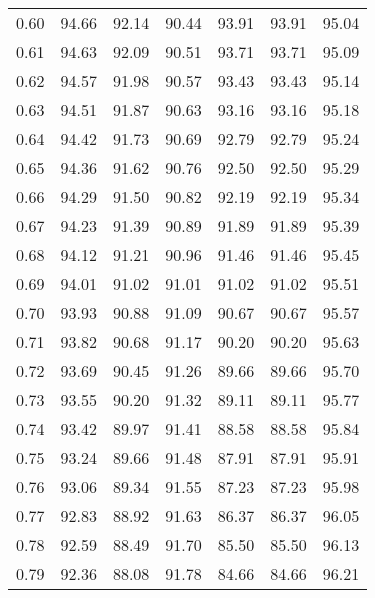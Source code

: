 \begin{tabular}{|c|c|c|c|c|c|c|}
      0.60 &     94.66 &     92.14 &      90.44 &   93.91 &      93.91 &         95.04 \\
      0.61 &     94.63 &     92.09 &      90.51 &   93.71 &      93.71 &         95.09 \\
      0.62 &     94.57 &     91.98 &      90.57 &   93.43 &      93.43 &         95.14 \\
      0.63 &     94.51 &     91.87 &      90.63 &   93.16 &      93.16 &         95.18 \\
      0.64 &     94.42 &     91.73 &      90.69 &   92.79 &      92.79 &         95.24 \\
      0.65 &     94.36 &     91.62 &      90.76 &   92.50 &      92.50 &         95.29 \\
      0.66 &     94.29 &     91.50 &      90.82 &   92.19 &      92.19 &         95.34 \\
      0.67 &     94.23 &     91.39 &      90.89 &   91.89 &      91.89 &         95.39 \\
      0.68 &     94.12 &     91.21 &      90.96 &   91.46 &      91.46 &         95.45 \\
      0.69 &     94.01 &     91.02 &      91.01 &   91.02 &      91.02 &         95.51 \\
      0.70 &     93.93 &     90.88 &      91.09 &   90.67 &      90.67 &         95.57 \\
      0.71 &     93.82 &     90.68 &      91.17 &   90.20 &      90.20 &         95.63 \\
      0.72 &     93.69 &     90.45 &      91.26 &   89.66 &      89.66 &         95.70 \\
      0.73 &     93.55 &     90.20 &      91.32 &   89.11 &      89.11 &         95.77 \\
      0.74 &     93.42 &     89.97 &      91.41 &   88.58 &      88.58 &         95.84 \\
      0.75 &     93.24 &     89.66 &      91.48 &   87.91 &      87.91 &         95.91 \\
      0.76 &     93.06 &     89.34 &      91.55 &   87.23 &      87.23 &         95.98 \\
      0.77 &     92.83 &     88.92 &      91.63 &   86.37 &      86.37 &         96.05 \\
      0.78 &     92.59 &     88.49 &      91.70 &   85.50 &      85.50 &         96.13 \\
      0.79 &     92.36 &     88.08 &      91.78 &   84.66 &      84.66 &         96.21 \\

\end{tabular}
